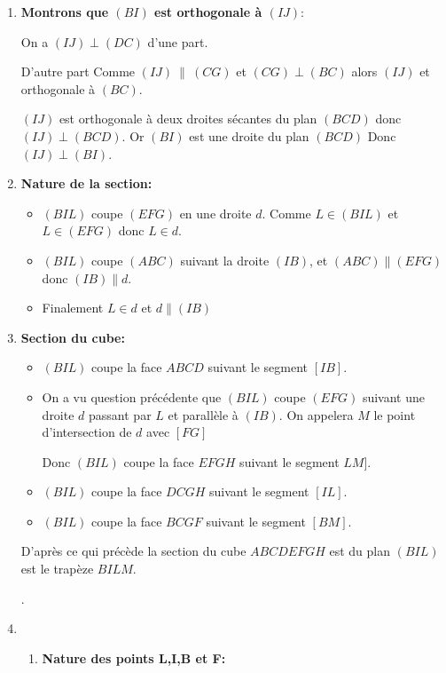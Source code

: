\documentclass[12pt,a4paper,french]{article}
\begin{document}
\begin{solution}
\begin{enumerate}
\item \textbf{Montrons que $(BI)$ est orthogonale à $(IJ)$}:

On a $(IJ) \perp (DC)$ d'une part.

D'autre part Comme $(IJ)\:\parallel \: (CG)$ et $(CG) \perp (BC)$ alors $(IJ)$ et orthogonale à $(BC)$. 

$(IJ)$ est orthogonale à deux droites sécantes du plan $(BCD)$ donc $(IJ) \perp (BCD)$.
Or $(BI)$ est une droite du plan $(BCD)$ Donc $(IJ) \perp (BI)$.

\item \textbf{Nature de la section:}
\begin{itemize}
\item $(BIL)$ coupe $(EFG)$ en une droite $d$. Comme $L \in (BIL)$ et $ L \in (EFG)$ donc $ L \in d$.
\item $(BIL)$ coupe $(ABC)$ suivant la droite $(IB)$, et $(ABC) \parallel (EFG)$ donc $(IB) \parallel d$.
\item Finalement $L \in d$ et $d \parallel (IB)$
\end{itemize}
\item \textbf{Section du cube:}
\begin{itemize}
\item $(BIL)$ coupe la face $ABCD$ suivant le segment $[IB]$.
\item On a vu question précédente que $(BIL)$ coupe $(EFG)$ suivant une droite $d$ passant par $L$ et parallèle à $(IB)$. On appelera $M$ le point d'intersection de $d$ avec $[FG]$

Donc $(BIL)$ coupe la face $EFGH$ suivant le segment 	$LM]$.
\item $(BIL)$ coupe la face $DCGH$ suivant le segment	$[IL]$.
\item $(BIL)$ coupe la face $BCGF$ suivant le segment $[BM]$.
\end{itemize}
D'après ce qui précède la section du cube $ABCDEFGH$ est du plan $(BIL)$ est le trapèze $BILM$.
\begin{center}
    \end{center}.
\item \begin{enumerate}
\item \textbf{Nature des points L,I,B et F:} 


\end{enumerate}
\end{enumerate}
\end{solution}
\end{document}
